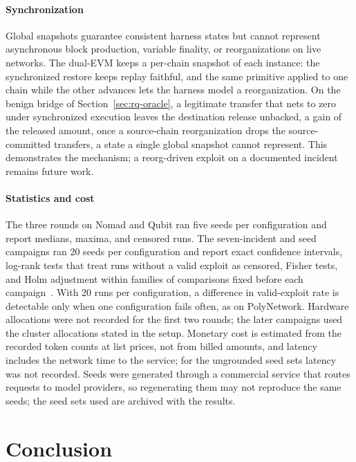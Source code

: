 \documentclass[a4paper]{cas-sc}
\begin{document}
\paragraph{Synchronization}
Global snapshots guarantee consistent harness states but cannot represent asynchronous block production, variable finality, or reorganizations on live networks. The dual-EVM keeps a per-chain snapshot of each instance: the synchronized restore keeps replay faithful, and the same primitive applied to one chain while the other advances lets the harness model a reorganization. On the benign bridge of Section~\ref{sec:rq-oracle}, a legitimate transfer that nets to zero under synchronized execution leaves the destination release unbacked, a gain of the released amount, once a source-chain reorganization drops the source-committed transfers, a state a single global snapshot cannot represent. This demonstrates the mechanism; a reorg-driven exploit on a documented incident remains future work.

\paragraph{Statistics and cost}
The three rounds on Nomad and Qubit ran five seeds per configuration and report medians, maxima, and censored runs. The seven-incident and seed campaigns ran 20 seeds per configuration and report exact confidence intervals, log-rank tests that treat runs without a valid exploit as censored, Fisher tests, and Holm adjustment within families of comparisons fixed before each campaign~\citep{klees2018evaluating}. With 20 runs per configuration, a difference in valid-exploit rate is detectable only when one configuration fails often, as on PolyNetwork. Hardware allocations were not recorded for the first two rounds; the later campaigns used the cluster allocations stated in the setup. Monetary cost is estimated from the recorded token counts at list prices, not from billed amounts, and latency includes the network time to the service; for the ungrounded seed sets latency was not recorded. Seeds were generated through a commercial service that routes requests to model providers, so regenerating them may not reproduce the same seeds; the seed sets used are archived with the results.

\section{Conclusion}\label{sec:conclusion}
\end{document}
